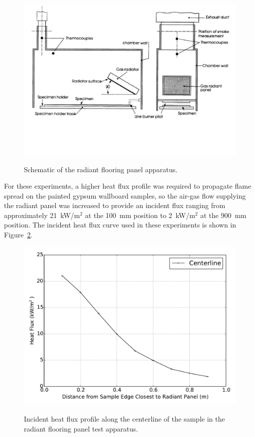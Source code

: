 \documentclass[twoside]{uocthesis}
\begin{document}
{\begin{figure}
	\centering
	\includegraphics[width=\textwidth]{../Figures/FLR_Radpan} \\
	\caption[Schematic of the radiant flooring panel apparatus.]{Schematic of the radiant flooring panel apparatus.}
	\label{FLR_Radpan}
\end{figure}

 For these experiments, a higher heat flux profile was required to propagate flame spread on the painted gypsum wallboard samples, so the air-gas flow supplying the radiant panel was increased to provide an incident flux ranging from approximately 21~kW/m$^2$ at the 100~mm position to 2~kW/m$^2$ at the 900~mm position.  The incident heat flux curve used in these experiments is shown in Figure~\ref{FRP_HF_Calibration}.   

\begin{figure}
	\centering
	\includegraphics[width=\textwidth]{../Figures/FRP_HF_Calibration} \\
	\caption[Incident heat flux profile in the radiant flooring panel test apparatus.]{Incident heat flux profile along the centerline of the sample in the radiant flooring panel test apparatus.}
	\label{FRP_HF_Calibration}
\end{figure}


}
\end{document}
